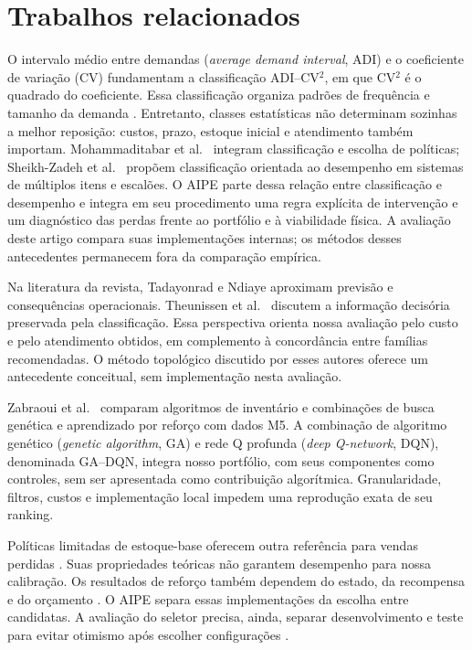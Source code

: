 \documentclass[preprint,12pt]{elsarticle}
\begin{document}
\section{Trabalhos relacionados}
O intervalo médio entre demandas (\textit{average demand interval}, ADI) e o coeficiente de variação (CV) fundamentam a classificação ADI--CV$^2$, em que CV$^2$ é o quadrado do coeficiente. Essa classificação organiza padrões de frequência e tamanho da demanda \cite{syntetos2005}. Entretanto, classes estatísticas não determinam sozinhas a melhor reposição: custos, prazo, estoque inicial e atendimento também importam. Mohammaditabar et al.\ \cite{Mohammaditabar2012Integrated} integram classificação e escolha de políticas; Sheikh-Zadeh et al.\ \cite{SheikhZadeh2021PBIC} propõem classificação orientada ao desempenho em sistemas de múltiplos itens e escalões. O AIPE parte dessa relação entre classificação e desempenho e integra em seu procedimento uma regra explícita de intervenção e um diagnóstico das perdas frente ao portfólio e à viabilidade física. A avaliação deste artigo compara suas implementações internas; os métodos desses antecedentes permanecem fora da comparação empírica.

Na literatura da revista, Tadayonrad e Ndiaye \cite{sca_f81ad2b3e023} aproximam previsão e consequências operacionais. Theunissen et al.\ \cite{sca_c5c06dcbc9e5} discutem a informação decisória preservada pela classificação. Essa perspectiva orienta nossa avaliação pelo custo e pelo atendimento obtidos, em complemento à concordância entre famílias recomendadas. O método topológico discutido por esses autores oferece um antecedente conceitual, sem implementação nesta avaliação.

Zabraoui et al.\ \cite{sca_27e994c54848} comparam algoritmos de inventário e combinações de busca genética e aprendizado por reforço com dados M5. A combinação de algoritmo genético (\textit{genetic algorithm}, GA) e rede Q profunda (\textit{deep Q-network}, DQN), denominada GA--DQN, integra nosso portfólio, com seus componentes como controles, sem ser apresentada como contribuição algorítmica. Granularidade, filtros, custos e implementação local impedem uma reprodução exata de seu ranking.

Políticas limitadas de estoque-base oferecem outra referência para vendas perdidas \cite{Xin2021CappedBaseStock}. Suas propriedades teóricas não garantem desempenho para nossa calibração. Os resultados de reforço também dependem do estado, da recompensa e do orçamento \cite{Boute2022DRLInventoryRoadmap}. O AIPE separa essas implementações da escolha entre candidatas. A avaliação do seletor precisa, ainda, separar desenvolvimento e teste para evitar otimismo após escolher configurações \cite{CawleyTalbot2010}.
\end{document}
